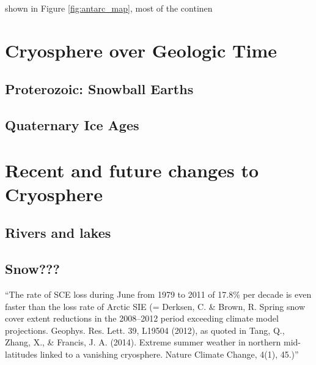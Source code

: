\documentclass[amstex,12pt]{book}
\begin{document}
 shown in Figure \ref{fig:antarc_map}, most of the continen %

\section{Cryosphere over Geologic Time}
\subsection{Proterozoic: Snowball Earths}
\subsection{Quaternary Ice Ages}

\section{Recent and future changes to Cryosphere}
\subsection{Rivers and lakes}
\subsection{Snow???}
``The rate of SCE loss during June from 1979 to 2011 of 17.8\% per decade is even faster than the loss rate of Arctic SIE (= Derksen, C. \& Brown, R. Spring snow cover extent reductions in the 2008–2012 period exceeding climate model projections. Geophys. Res. Lett. 39, L19504 (2012), as quoted in Tang, Q., Zhang, X., \& Francis, J. A. (2014). Extreme summer weather in northern mid-latitudes linked to a vanishing cryosphere. Nature Climate Change, 4(1), 45.)''
\end{document}
